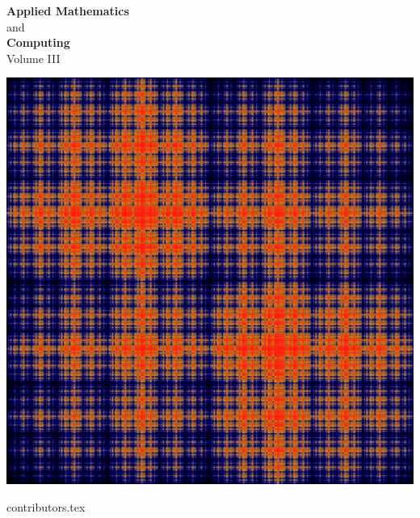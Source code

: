 \documentclass[nociteref]{newsiambook}
\begin{document}
\thispagestyle{empty}
\begin{center}
{\huge \bf Applied Mathematics} \\ and \\ {\huge \bf Computing} \\
\vspace{5mm}
{\Large Volume III}
\vspace{20mm}

\includegraphics[scale = .25]{Cover}
\end{center}
\frontmatter

{contributors.tex}

\end{document}
